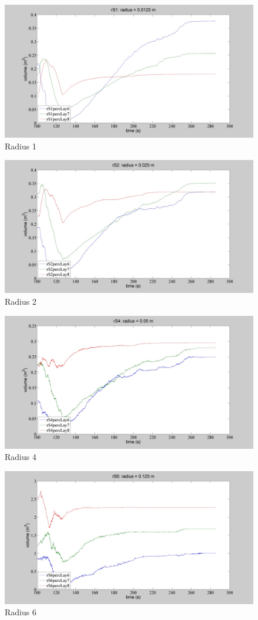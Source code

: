 \begin{figure}%
\centering 
\includegraphics[width=.48\columnwidth]{images/043rS1} 
\caption{Radius 1}
\label{fig:043rS1} 
\end{figure}
\begin{figure}%
\centering 
\includegraphics[width=.48\columnwidth]{images/044rS2} 
\caption{Radius 2}
\label{fig:044rS2} 
\end{figure}
\begin{figure}%
\centering 
\includegraphics[width=.48\columnwidth]{images/045rS4}
\caption{Radius 4}
\label{fig:045rS4} 
\end{figure}
\begin{figure}%
\centering 
\includegraphics[width=.48\columnwidth]{images/046rS6} 
\caption{Radius 6}
\label{fig:046rS6} 
\end{figure}